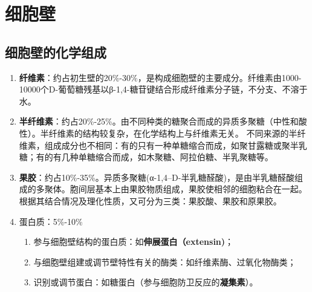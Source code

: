 \section{细胞壁}
\subsection{细胞壁的化学组成}
\begin{enumerate}
    \item \textbf{纤维素}：约占初生壁的20\%-30\%，是构成细胞壁的主要成分。纤维素由1000-10000个D-葡萄糖残基以β-1,4-糖苷键结合形成纤维素分子链，不分支、不溶于水。
    \item \textbf{半纤维素}：约占20\%-25\%。由不同种类的糖聚合而成的异质多聚糖（中性和酸性）。半纤维素的结构较复杂，在化学结构上与纤维素无关。 不同来源的半纤维素，组成成分也不相同：有的只有一种单糖缩合而成，如聚甘露糖或聚半乳糖；有的有几种单糖缩合而成，如木聚糖、阿拉伯糖、半乳聚糖等。
    \item \textbf{果胶}：约占10\%-35\%。异质多聚糖(α-1,4–D-半乳糖醛酸)，是由半乳糖醛酸组成的多聚体。胞间层基本上由果胶物质组成，果胶使相邻的细胞粘合在一起。根据其结合情况及理化性质，又可分为三类：果胶酸、果胶和原果胶。 
    \item 蛋白质：5\%-10\%
    \begin{enumerate}
        \item 参与细胞壁结构的蛋白质：如\textbf{伸展蛋白（extensin)}；
        \item 与细胞壁组建或调节壁特性有关的酶类：如纤维素酶、过氧化物酶类；
        \item 识别或调节蛋白：如糖蛋白（参与细胞防卫反应的\textbf{凝集素}）。
    \end{enumerate}
\end{enumerate}
